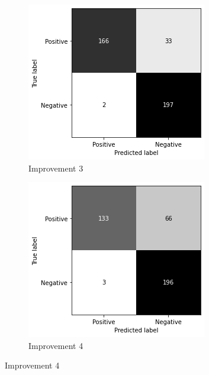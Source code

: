 \begin{figure}
    \centering
    \begin{subfigure}[b]{0.49\textwidth}
        \centering
        \includegraphics[width=\textwidth]{figures/cm-improv-3.png}
        \caption{Improvement 3}
        \label{fig:cm-improv-3}
    \end{subfigure}
    \hfill
    \begin{subfigure}[b]{0.49\textwidth}
        \centering
        \includegraphics[width=\textwidth]{figures/cm-improv-4.png}
        \caption{Improvement 4}
        \label{fig:cm-improv-4}
    \end{subfigure}
    \vspace{10mm} %
    

\end{figure}
